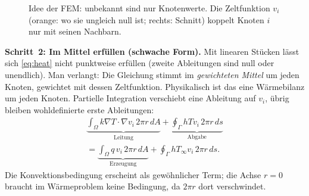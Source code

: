 \documentclass[a4paper, 10pt, conference]{ieeeconf}
\theoremstyle{remark}
\begin{document}
\begin{figure}[t]
\centering
{}
\caption{Idee der FEM: unbekannt sind nur Knotenwerte. Die Zeltfunktion
$v_i$ (orange: wo sie ungleich null ist; rechts: Schnitt) koppelt Knoten
$i$ nur mit seinen Nachbarn.}
\label{fig:fem}
\end{figure}

\textbf{Schritt~2: Im Mittel erfüllen (schwache Form).} Mit linearen
Stücken lässt sich \eqref{eq:heat} nicht punktweise erfüllen (zweite
Ableitungen sind null oder unendlich). Man verlangt: Die Gleichung stimmt
im \emph{gewichteten Mittel} um jeden Knoten, gewichtet mit dessen
Zeltfunktion. Physikalisch ist das eine Wärmebilanz um jeden Knoten.
Partielle Integration verschiebt eine Ableitung auf $v_i$, übrig bleiben
wohldefinierte erste Ableitungen:
\begin{multline}
  \underbrace{\int_\Omega k\nabla T\!\cdot\!\nabla v_i\,2\pi r\,dA}_{\text{Leitung}}
  +\underbrace{\oint_\Gamma hTv_i\,2\pi r\,ds}_{\text{Abgabe}}\\
  =\underbrace{\int_\Omega q\,v_i\,2\pi r\,dA}_{\text{Erzeugung}}
  +\oint_\Gamma hT_\infty v_i\,2\pi r\,ds .
  \label{eq:weak}
\end{multline}
Die Konvektionsbedingung erscheint als gewöhnlicher Term; die Achse
$r=0$ braucht im Wärmeproblem keine Bedingung, da $2\pi r$ dort verschwindet.
\end{document}
